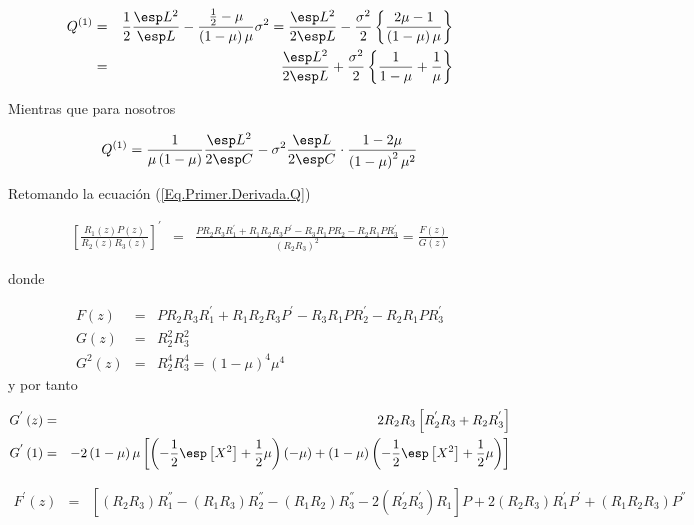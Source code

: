 \begin{eqnarray*}
Q^{(1)}&=&\frac{1}{2}\frac{\esp L^{2}}{\esp L}-\frac{\frac{1}{2}-\mu}{\left(1-\mu\right)\mu}\sigma^{2}
=\frac{\esp L^{2}}{2\esp L}-\frac{\sigma^{2}}{2}\left\{\frac{2\mu-1}{\left(1-\mu\right)\mu}\right\}\\
&=&\frac{\esp L^{2}}{2\esp L}+\frac{\sigma^{2}}{2}\left\{\frac{1}{1-\mu}+\frac{1}{\mu}\right\}
\end{eqnarray*}

Mientras que para nosotros

\begin{eqnarray*}
Q^{(1)}=\frac{1}{\mu\left(1-\mu\right)}\frac{\esp L^{2}}{2\esp C}
-\sigma^{2}\frac{\esp L}{2\esp C}\cdot\frac{1-2\mu}{\left(1-\mu\right)^{2}\mu^{2}}
\end{eqnarray*}

Retomando la ecuaci\'on (\ref{Eq.Primer.Derivada.Q})

\begin{eqnarray*}
\left[\frac{R_{1}\left(z\right)P\left(z\right)}{R_{2}\left(z\right)R_{3}\left(z\right)}\right]^{'}&=&\frac{PR_{2}R_{3}R_{1}^{'}
+R_{1}R_{2}R_{3}P^{'}-R_{3}R_{1}PR_{2}-R_{2}R_{1}PR_{3}^{'}}{\left(R_{2}R_{3}\right)^{2}}
=\frac{F\left(z\right)}{G\left(z\right)}
\end{eqnarray*}

donde 

\begin{eqnarray*}
F\left(z\right)&=&PR_{2}R_{3}R_{1}^{'}
+R_{1}R_{2}R_{3}P^{'}-R_{3}R_{1}PR_{2}^{'}-R_{2}R_{1}PR_{3}^{'}\\
G\left(z\right)&=&R_{2}^{2}R_{3}^{2}\\
G^{2}\left(z\right)&=&R_{2}^{4}R_{3}^{4}=\left(1-\mu\right)^{4}\mu^{4}
\end{eqnarray*}
y por tanto

\begin{eqnarray*}
G^{'}\left(z\right)&=&2R_{2}R_{3}\left[R_{2}^{'}R_{3}+R_{2}R_{3}^{'}\right]\\
G^{'}\left(1\right)&=&-2\left(1-\mu\right)\mu\left[\left(-\frac{1}{2}\esp\left[X^{2}\right]+\frac{1}{2}\mu\right)\left(-\mu\right)+\left(1-\mu\right)\left(-\frac{1}{2}\esp\left[X^{2}\right]+\frac{1}{2}\mu\right)\right]
\end{eqnarray*}


\begin{eqnarray*}
F^{'}\left(z\right)&=&\left[\left(R_{2}R_{3}\right)R_{1}^{''}
-\left(R_{1}R_{3}\right)R_{2}^{''}
-\left(R_{1}R_{2}\right)R_{3}^{''}
-2\left(R_{2}^{'}R_{3}^{'}\right)R_{1}\right]P
+2\left(R_{2}R_{3}\right)R_{1}^{'}P^{'}
+\left(R_{1}R_{2}R_{3}\right)P^{''}
\end{eqnarray*}

